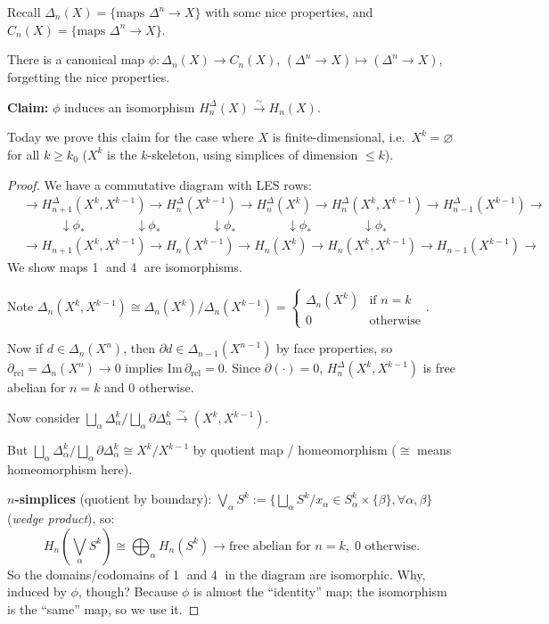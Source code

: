 \documentclass[12pt]{amsart}
\begin{document}
Recall $\Delta_n(X) = \{\text{maps } \Delta^n \to X\}$ with some nice properties, and $C_n(X) = \{\text{maps } \Delta^n \to X\}$.

There is a canonical map $\phi: \Delta_n(X) \to C_n(X)$, $(\Delta^n \to X) \mapsto (\Delta^n \to X)$, forgetting the nice properties.

\textbf{Claim:} $\phi$ induces an isomorphism $H_n^\Delta(X) \xrightarrow{\sim} H_n(X)$.

Today we prove this claim for the case where $X$ is finite-dimensional, i.e.\ $X^k = \varnothing$ for all $k \geq k_0$ ($X^k$ is the $k$-skeleton, using simplices of dimension $\leq k$).

\begin{proof}
We have a commutative diagram with LES rows:
\begin{align*}
    &\to H_{n+1}^\Delta(X^k, X^{k-1}) \to H_n^\Delta(X^{k-1}) \to H_n^\Delta(X^k) \to H_n^\Delta(X^k, X^{k-1}) \to H_{n-1}^\Delta(X^{k-1}) \to \\
    &\quad\quad\quad \downarrow\phi_* \quad\quad\quad\quad \downarrow\phi_* \quad\quad\quad\quad \downarrow\phi_* \quad\quad\quad\quad \downarrow\phi_* \quad\quad\quad\quad \downarrow\phi_* \\
    &\to H_{n+1}(X^k, X^{k-1}) \to H_n(X^{k-1}) \to H_n(X^k) \to H_n(X^k, X^{k-1}) \to H_{n-1}(X^{k-1}) \to
\end{align*}
We show maps \textcircled{1} and \textcircled{4} are isomorphisms.

Note $\Delta_n(X^k, X^{k-1}) \cong \Delta_n(X^k)/\Delta_n(X^{k-1}) = \begin{cases} \Delta_n(X^k) & \text{if } n=k \\ 0 & \text{otherwise} \end{cases}$.

Now if $d \in \Delta_n(X^n)$, then $\partial d \in \Delta_{n-1}(X^{n-1})$ by face properties, so $\partial_\mathrm{rel} = \Delta_n(X^n) \to 0$ implies $\mathrm{Im}\, \partial_\mathrm{rel} = 0$. Since $\partial(\cdot) = 0$, $H_n^\Delta(X^k, X^{k-1})$ is free abelian for $n=k$ and $0$ otherwise.

Now consider $\bigsqcup_\alpha \Delta^k_\alpha / \bigsqcup_\alpha \partial \Delta^k_\alpha \xrightarrow{\sim} (X^k, X^{k-1})$.

But $\bigsqcup_\alpha \Delta^k_\alpha / \bigsqcup_\alpha \partial \Delta^k_\alpha \cong X^k/X^{k-1}$ by quotient map / homeomorphism ($\cong$ means homeomorphism here).

\textbf{$n$-simplices} (quotient by boundary): $\bigvee_\alpha S^k := \{\bigsqcup_\alpha S^k / x_\alpha \in S_\alpha^k \times \{\beta\}, \forall \alpha, \beta\}$ (\emph{wedge product}), so:
\[
    H_n\!\left(\bigvee_\alpha S^k\right) \cong \bigoplus_\alpha H_n(S^k) \to \text{free abelian for } n=k, \; 0 \text{ otherwise.}
\]
So the domains/codomains of \textcircled{1} and \textcircled{4} in the diagram are isomorphic. Why, induced by $\phi$, though? Because $\phi$ is almost the ``identity'' map; the isomorphism is the ``same'' map, so we use it.


\end{proof}
\end{document}
